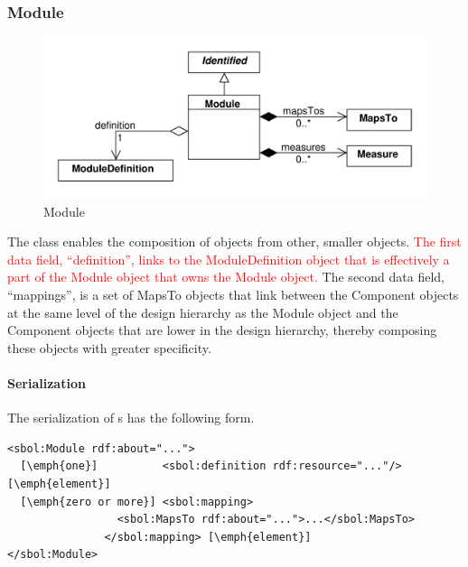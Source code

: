 \subsubsection{Module}
\label{sec:Module}

\begin{figure}[ht]
\begin{center}
\includegraphics[scale=0.6]{uml/module}
\caption[]{Module}
\label{uml:module}
\end{center}
\end{figure}

The  class enables the composition of  objects from other, smaller  objects. \textcolor{red}{The first data field, ``definition'', links to the ModuleDefinition object that is effectively a part of the Module object that owns the Module object.} The second data field, ``mappings'', is a set of MapsTo objects that link between the Component objects at the same level of the design hierarchy as the Module object and the Component objects that are lower in the design hierarchy, thereby composing these objects with greater specificity.


\paragraph{Serialization}
The serialization of s has the following form.
\begin{lstlisting}
<sbol:Module rdf:about="...">
  [\emph{one}]          <sbol:definition rdf:resource="..."/>[\emph{element}]
  [\emph{zero or more}] <sbol:mapping>
                 <sbol:MapsTo rdf:about="...">...</sbol:MapsTo>
               </sbol:mapping> [\emph{element}]
</sbol:Module>
\end{lstlisting}

